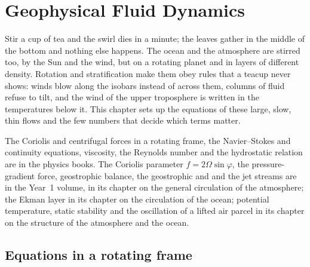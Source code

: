 \chapter{Geophysical Fluid Dynamics}\label{ch:b3:gfd-foundations}

Stir a cup of tea and the swirl dies in a minute; the leaves gather in the
middle of the bottom and nothing else happens. The ocean and the atmosphere
are stirred too, by the Sun and the wind, but on a rotating planet and in
layers of different density. Rotation and stratification make them obey
rules that a teacup never shows: winds blow along the isobars instead of
across them, columns of fluid refuse to tilt, and the wind of the upper
troposphere is written in the temperatures below it. This chapter sets up
the equations of these large, slow, thin flows and the few numbers that
decide which terms matter.

\begin{recall}
The Coriolis and centrifugal forces in a rotating frame, the Navier--Stokes
and continuity equations, viscosity, the Reynolds number and the hydrostatic
relation are in the physics books. The Coriolis parameter $f = 2\Omega
\sin\varphi$, the pressure-gradient force, geostrophic balance, the
geostrophic and  and the jet streams are in the Year~1
volume, in its chapter on the general circulation of the atmosphere; the
Ekman layer in its chapter on the circulation of the ocean; potential
temperature, static stability and the oscillation of a lifted air parcel in
its chapter on the structure of the atmosphere and the ocean.
\end{recall}

\section{Equations in a rotating frame}\label{sec:b3:gfd-foundations:equations}


